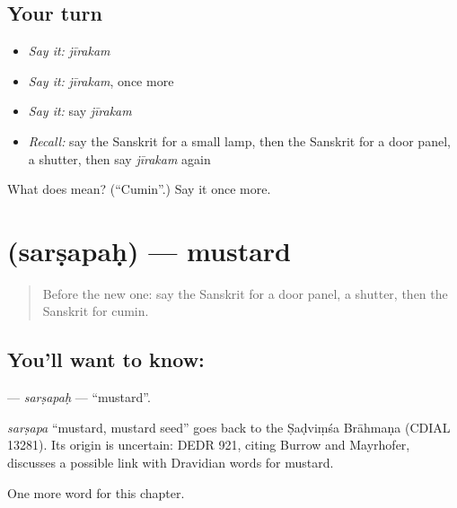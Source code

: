 \subsection*{Your turn}
\begin{itemize}
\raggedright
  \item \emph{Say it:} \emph{jīrakam}
  \item \emph{Say it:} \emph{jīrakam}, once more
  \item \emph{Say it:} say \emph{jīrakam}
  \item \emph{Recall:} say the Sanskrit for a small lamp, then the Sanskrit for a door panel, a shutter, then say \emph{jīrakam} again
\end{itemize}

\begin{tcolorbox}[breakable,colback=teal!4,colframe=teal!35!black,title={Before you move on}]
What does  mean? (\textquotedblleft{}Cumin\textquotedblright{}.) Say it once more.
\end{tcolorbox}
\section[\texorpdfstring{\sk{सर्षपः} (sarṣapaḥ)}{सर्षपः (sarṣapaḥ)}]{ (sarṣapaḥ) — mustard}

\label{lesson:SA-C159-sarsapah}



\begin{quote}
Before the new one: say the Sanskrit for a door panel, a shutter, then the Sanskrit for cumin.
\end{quote}

\subsection*{You'll want to know: }
\textbf{} — \emph{sarṣapaḥ} — \textquotedblleft{}mustard\textquotedblright{}.

\begin{cousinweb}
\emph{sarṣapa} \textquotedblleft{}mustard, mustard seed\textquotedblright{} goes back to the Ṣaḍviṃśa Brāhmaṇa (CDIAL 13281). Its origin is uncertain: DEDR 921, citing Burrow and Mayrhofer, discusses a possible link with Dravidian words for mustard.
\end{cousinweb}

\begin{grammarlens}[title={What you've built}]
One more word for this chapter.
\end{grammarlens}

